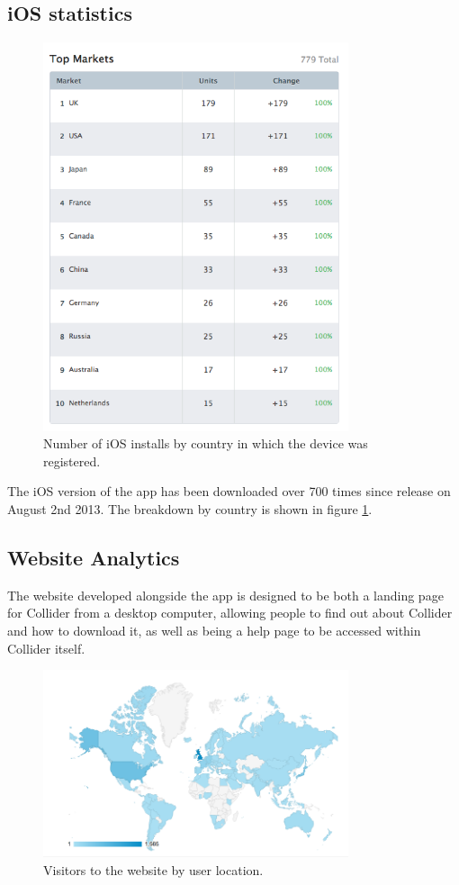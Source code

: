\documentclass[12pt]{article}
\begin{document}
\subsection{iOS statistics}
\begin{figure}
\centering
    \includegraphics[width=0.8\textwidth]{img/ioscountries.png}
    \caption{\label{fig:ioscountries}Number of iOS installs by country in which the device was registered.}
\end{figure}
The iOS version of the app has been downloaded over 700 times since release on August 2nd 2013. The breakdown by country is shown 
in figure \ref{fig:ioscountries}.

\subsection{Website Analytics}
The website developed alongside the app is designed to be both a landing page for Collider from a desktop computer, allowing people to find out about Collider and how to download it, as well as being a help page to be accessed within Collider itself.

\begin{figure}
\centering
    \includegraphics[width=0.8\textwidth]{img/webmap.png}
    \caption{\label{fig:webmap}Visitors to the website by user location.}
\end{figure}
\end{document}
